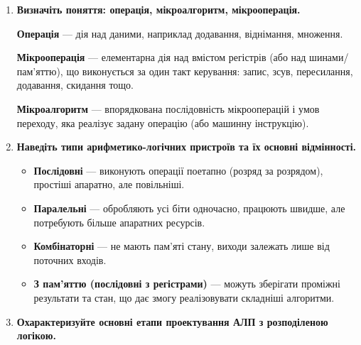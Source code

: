 \documentclass[12pt,a4paper]{article}
\begin{document}
\begin{enumerate}
        Розрядність вузлів (регістрів, шин, суматорів, лічильників) визначається з урахуванням:
        \begin{itemize}
            \item розрядності операндів (цілої та дробової частин, якщо це дроби);
            \item максимально можливого розряду добутку/суми (щоб уникнути переповнення);
            \item необхідних службових бітів (знак, перенос, біти зсуву/вирівнювання).
        \end{itemize}
        На практиці правильність обраної розрядності перевіряють моделюванням на граничних значеннях операндів.

        \item \textbf{Визначіть поняття: операція, мікроалгоритм, мікрооперація.}

        \textbf{Операція} --- дія над даними, наприклад додавання, віднімання, множення.

        \textbf{Мікрооперація} --- елементарна дія над вмістом регістрів (або над шинами/пам'яттю), що виконується за один такт керування:
        запис, зсув, пересилання, додавання, скидання тощо.

        \textbf{Мікроалгоритм} --- впорядкована послідовність мікрооперацій і умов переходу, яка реалізує задану операцію (або машинну інструкцію).

        \item \textbf{Наведіть типи арифметико-логічних пристроїв та їх основні відмінності.}

        \begin{itemize}
            \item \textbf{Послідовні} --- виконують операції поетапно (розряд за розрядом), простіші апаратно, але повільніші.
            \item \textbf{Паралельні} --- обробляють усі біти одночасно, працюють швидше, але потребують більше апаратних ресурсів.
            \item \textbf{Комбінаторні} --- не мають пам'яті стану, виходи залежать лише від поточних входів.
            \item \textbf{З пам'яттю (послідовні з регістрами)} --- можуть зберігати проміжні результати та стан, що дає змогу реалізовувати складніші алгоритми.
        \end{itemize}

        \item \textbf{Охарактеризуйте основні етапи проектування АЛП з розподіленою логікою.}


\end{enumerate}
\end{document}
